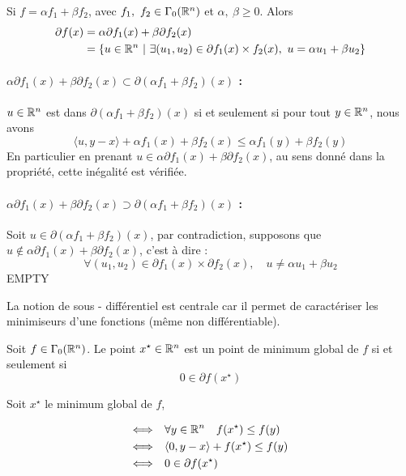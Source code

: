 \documentclass[a4paper,12pt]{article}
\begin{document}
\begin{propriete}
Si $f = \alpha f_1+\beta f_2$, avec $f_1,\ f_2\in\Gamma_0(\mathbb{R}^n)$ et $\alpha,\ \beta \geq 0$. Alors 
\begin{align*}
\partial f(x) &= \alpha \partial f_1(x) + \beta \partial f_2(x) \\
&= \left\{u\in\mathbb{R}^n\ |\ \exists (u_1,u_2)\in \partial f_1(x)\times f_2(x),\ u = \alpha u_1 + \beta u_2 \right\}
\end{align*}
\end{propriete}
\begin{preuve}
\vspace{-1cm}
\paragraph{$\alpha\partial f_1(x) +\beta \partial f_2(x) \subset
\partial (\alpha f_1 +\beta f_2)(x)$ :}$u\in\mathbb{R}^n$ est dans $\partial (\alpha f_1 +\beta f_2)(x)$ si et seulement si pour tout $y\in \mathbb{R}^n$, nous avons 
$$
\langle u,y-x\rangle + \alpha f_1(x) +\beta f_2(x) \leq  \alpha f_1(y) +\beta f_2(y) 
$$
En particulier en prenant $u\in \alpha\partial f_1(x) +\beta \partial f_2(x) $, au sens donné dans la propriété, cette inégalité est vérifiée. 

\paragraph{$\alpha\partial f_1(x) +\beta \partial f_2(x) \supset
\partial (\alpha f_1 +\beta f_2)(x)$ :}Soit $u\in\partial (\alpha f_1 +\beta f_2)(x)$, par contradiction, supposons que  $u\notin \alpha\partial f_1(x) +\beta \partial f_2(x)$, c'est à dire : 
$$
\forall (u_1,u_2)\in \partial f_1(x) \times \partial f_2(x),\quad u\neq \alpha u_1+\beta u_2
$$
{\Huge EMPTY}
\end{preuve}

La notion de sous - différentiel est centrale car il permet de caractériser les minimiseurs d'une fonctions (même non différentiable).
\begin{theoreme}{}
Soit $f\in\Gamma_0(\mathbb{R}^n)$. Le point $x^{\star}\in\mathbb{R}^n$ est un point de minimum global de $f$ si et seulement si 
$$
0\in \partial f(x^{\star})
$$ 
\end{theoreme}
\begin{preuve}
\vspace{-1cm}
Soit $x^{\star}$ le minimum global de $f$, 

\begin{align*}
\Longleftrightarrow \quad & \forall y\in\mathbb{R}^n\quad  f(x^{\star})                        \leq f(y)\\
\Longleftrightarrow \quad &                  \langle 0,y-x\rangle +f(x^{\star})  \leq f(y)\\
\Longleftrightarrow \quad &                   0\in \partial f(x^{\star})       
\end{align*}

\end{preuve}
\end{document}
